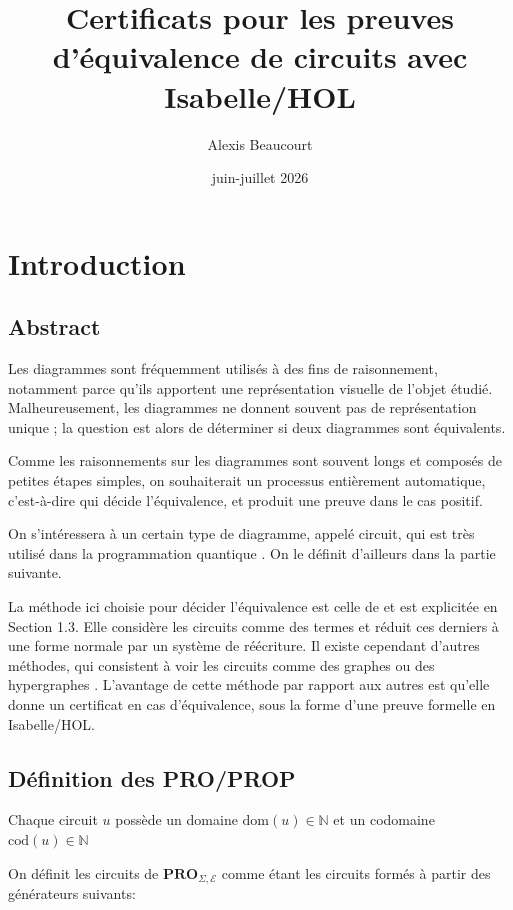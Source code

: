\documentclass[12pt, a4paper]{article}
\title{Certificats pour les preuves d'équivalence de circuits avec Isabelle/HOL}
\date{juin-juillet 2026}
\author{Alexis Beaucourt}
\def\N{ \mathbb N }
\def\pro#1{ \mathbf{PRO}_{ #1 } }
\def\dom{ \mathrm{dom} }
\def\cod{ \mathrm{cod} }
\begin{document}
\maketitle

\tableofcontents

\section{Introduction}

\subsection{Abstract}

Les diagrammes sont fréquemment utilisés à des fins de raisonnement, notamment parce qu'ils apportent une représentation visuelle de l'objet étudié. Malheureusement, les diagrammes ne donnent souvent pas de représentation unique ; la question est alors de déterminer si deux diagrammes sont équivalents.

Comme les raisonnements sur les diagrammes sont souvent longs et composés de petites étapes simples, on souhaiterait un processus entièrement automatique, c'est-à-dire qui décide l'équivalence, et produit une preuve dans le cas positif.

On s'intéressera à un certain type de diagramme, appelé circuit, qui est très utilisé dans la programmation quantique \cite{qccompleteness}. On le définit d'ailleurs dans la partie suivante.

La méthode ici choisie pour décider l'équivalence est celle de \cite{terms} et est explicitée en Section 1.3. Elle considère les circuits comme des termes et réduit ces derniers à une forme normale par un système de réécriture. Il existe cependant d'autres méthodes, qui consistent à voir les circuits comme des graphes \cite{portgraphs} ou des hypergraphes \cite{hypergraphs}. L'avantage de cette méthode par rapport aux autres est qu'elle donne un certificat en cas d'équivalence, sous la forme d'une preuve formelle en Isabelle/HOL.

\subsection{Définition des PRO/PROP}

Chaque circuit $u$ possède un domaine $\dom(u) \in \N$ et un codomaine $\cod(u) \in \N$

On définit les circuits de $\pro{\Sigma, \mathcal E}$ comme étant les circuits formés à partir des générateurs suivants:
\end{document}
